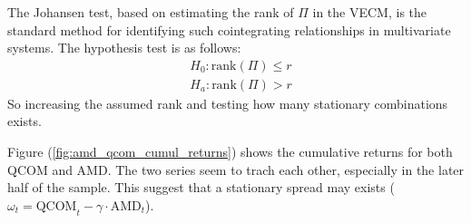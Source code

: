 The Johansen test, based on estimating the rank of \( \Pi \) in the VECM, is the standard method for identifying such cointegrating relationships in multivariate systems. The hypothesis test is as follows:
\begin{equation}
	\begin{aligned}
		&H_0:\text{rank}(\Pi)\leq r\\
		&H_a:\text{rank}(\Pi)>r
	\end{aligned}
\end{equation}
So increasing the assumed rank and testing how many stationary combinations exists. 


Figure (\ref{fig:amd_qcom_cumul_returns}) shows the cumulative returns for both QCOM and AMD. The two series seem to trach each other, especially in the later half of the sample. This suggest that a stationary spread may exists ($\omega_t=\text{QCOM}_t-\gamma\cdot\text{AMD}_t$). 